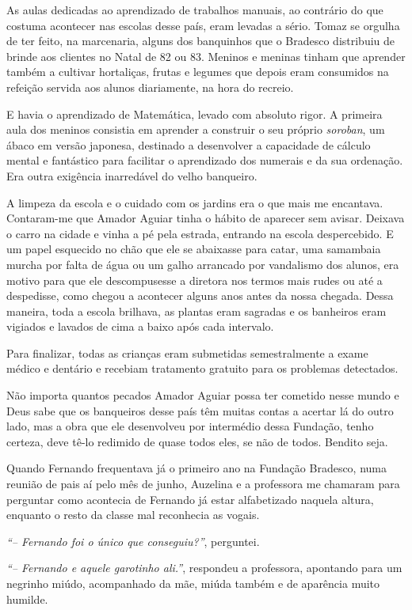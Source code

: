 As aulas dedicadas ao aprendizado de trabalhos manuais, ao contrário do que costuma acontecer nas escolas desse país, eram levadas a sério.
Tomaz se orgulha de ter feito, na marcenaria, alguns dos banquinhos que o Bradesco distribuiu de brinde aos clientes no Natal de 82 ou 83.
Meninos e meninas tinham que aprender também a cultivar hortaliças, frutas e legumes que depois eram consumidos na refeição servida aos alunos diariamente, na hora do recreio.

E havia o aprendizado de Matemática, levado com absoluto rigor.
A primeira aula dos meninos consistia em aprender a construir o seu próprio \textit{soroban}, um ábaco em versão japonesa, destinado a desenvolver a capacidade de cálculo mental e fantástico para facilitar o aprendizado dos numerais e da sua ordenação.
Era outra exigência inarredável do velho banqueiro.

A limpeza da escola e o cuidado com os jardins era o que mais me encantava.
Contaram-me que Amador Aguiar tinha o hábito de aparecer sem avisar.
Deixava o carro na cidade e vinha a pé pela estrada, entrando na escola despercebido.
E um papel esquecido no chão que ele se abaixasse para catar, uma samambaia murcha por falta de água ou um galho arrancado por vandalismo dos alunos, era motivo para que ele descompusesse a diretora nos termos mais rudes ou até a despedisse, como chegou a acontecer alguns anos antes da nossa chegada.
Dessa maneira, toda a escola brilhava, as plantas eram sagradas e os banheiros eram vigiados e lavados de cima a baixo após cada intervalo.
  
Para finalizar, todas as crianças eram submetidas semestralmente a exame médico e dentário e recebiam tratamento gratuito para os problemas detectados.

Não importa quantos pecados Amador Aguiar possa ter cometido nesse mundo e Deus sabe que os banqueiros desse país têm muitas contas a acertar lá do outro lado, mas a obra que ele desenvolveu por intermédio dessa Fundação, tenho certeza, deve tê-lo redimido de quase todos eles, se não de todos.
Bendito seja.

Quando Fernando frequentava já o primeiro ano na Fundação Bradesco, numa reunião de pais aí pelo mês de junho, Auzelina e a professora me chamaram para perguntar como acontecia de Fernando já estar alfabetizado naquela altura, enquanto o resto da classe mal reconhecia as vogais.

\textit{``-- Fernando foi o único que conseguiu?''}, perguntei.

\textit{``-- Fernando e aquele garotinho ali.''}, respondeu a professora, apontando para um negrinho miúdo, acompanhado da mãe, miúda também e de aparência muito humilde.

